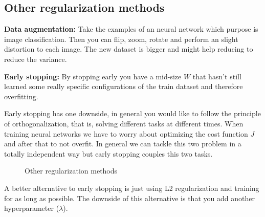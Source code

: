 \subsection*{Other regularization methods}
\textbf{Data augmentation:} Take the examples of an neural network which purpose is image
classification. Then you can flip, zoom, rotate and perform an slight distortion
to each image. The new dataset is bigger and might help reducing to reduce the variance.

\textbf{Early stopping:} By stopping early you have a mid-size $W$ that hasn't still
learned some really specific configurations of the train dataset and therefore overfitting.

Early stopping has one downside, in general you would like to follow the principle of 
orthogonalization, that is, solving different tasks at different times. When training
neural networks we have to worry about optimizing the cost function $J$ and after that
to not overfit. In general we can tackle this two problem in a totally independent way
but early stopping couples this two tasks.

\begin{figure}[H]
    \begin{center}
        \quad
        \caption{Other regularization methods}
    \end{center}
\end{figure}

A better alternative to early stopping is just using L2 regularization and training for 
as long as possible. The downside of this alternative is that you add another hyperparameter
($\lambda$).

